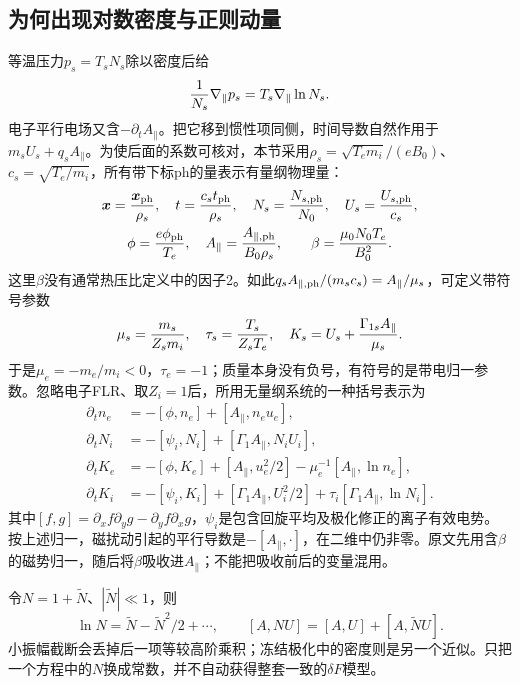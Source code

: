 \subsection{为何出现对数密度与正则动量}
等温压力$p_s=T_sN_s$除以密度后给
\begin{equation}
 {1\over N_s}\nabla_\parallel p_s=T_s\nabla_\parallel\ln N_s.
\end{equation}
电子平行电场又含$-\partial_tA_\parallel$。把它移到惯性项同侧，时间导数自然作用于$m_sU_s+q_sA_\parallel$。为使后面的系数可核对，本节采用$\rho_s=\sqrt{T_em_i}/(eB_0)$、$c_s=\sqrt{T_e/m_i}$，所有带下标$\mathrm{ph}$的量表示有量纲物理量：
\begin{gather}
 \bm{x}={\bm{x}_{\rm ph}\over\rho_s},\quad t={c_st_{\rm ph}\over\rho_s},\quad
 N_s={N_{s,\rm ph}\over N_0},\quad U_s={U_{s,\rm ph}\over c_s},\\
 \phi={e\phi_{\rm ph}\over T_e},\quad A_\parallel={A_{\parallel,\rm ph}\over B_0\rho_s},
 \qquad\beta={\mu_0N_0T_e\over B_0^2}.
\end{gather}
这里$\beta$没有通常热压比定义中的因子2。如此$q_sA_{\parallel,\rm ph}/(m_sc_s)=A_\parallel/\mu_s$，可定义带符号参数
\begin{equation}
 \mu_s={m_s\over Z_sm_i},\quad\tau_s={T_s\over Z_sT_e},\quad
 K_s=U_s+{\Gamma_{1s}A_\parallel\over\mu_s}.
\end{equation}
于是$\mu_e=-m_e/m_i<0$，$\tau_e=-1$；质量本身没有负号，有符号的是带电归一参数。忽略电子FLR、取$Z_i=1$后，所用无量纲系统的一种括号表示为
\begin{align}
 \partial_t n_e&=-[\phi,n_e]+[A_\parallel,n_eu_e],\\
 \partial_t N_i&=-[\psi_i,N_i]+[\Gamma_1A_\parallel,N_iU_i],\\
 \partial_t K_e&=-[\phi,K_e]+[A_\parallel,u_e^2/2]
                   -\mu_e^{-1}[A_\parallel,\ln n_e],\\
 \partial_t K_i&=-[\psi_i,K_i]+[\Gamma_1A_\parallel,U_i^2/2]
                   +\tau_i[\Gamma_1A_\parallel,\ln N_i].
\end{align}
其中$[f,g]=\partial_xf\partial_yg-\partial_yf\partial_xg$，$\psi_i$是包含回旋平均及极化修正的离子有效电势。按上述归一，磁扰动引起的平行导数是$-[A_\parallel,\cdot]$，在二维中仍非零。原文先用含$\beta$的磁势归一，随后将$\beta$吸收进$A_\parallel$；不能把吸收前后的变量混用。

令$N=1+\widetilde N$、$|\widetilde N|\ll1$，则
\begin{equation}
 \ln N=\widetilde N-\widetilde N^2/2+\cdots,\qquad
 [A,NU]=[A,U]+[A,\widetilde N U].
\end{equation}
小振幅截断会丢掉后一项等较高阶乘积；冻结极化中的密度则是另一个近似。只把一个方程中的$N$换成常数，并不自动获得整套一致的$\delta F$模型。


